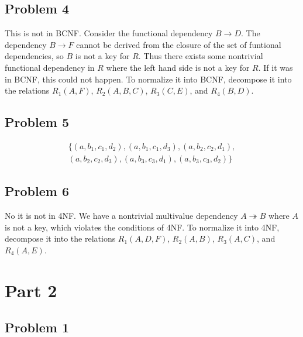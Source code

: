 \documentclass[12pt]{article}
\begin{document}
\subsection*{Problem 4}

This is not in BCNF. Consider the functional dependency \(B\rightarrow D\). The dependency \(B\rightarrow F\) cannot be derived from the closure of the
set of funtional dependencies, so \(B\) is not a key for \(R\). Thus there exists some nontrivial functional dependency in \(R\) where the left hand side
is not a key for \(R\). If it was in BCNF, this could not happen. To normalize it into BCNF, decompose it into the relations \(R_1(A,F)\), \(R_2(A,B,C)\),
\(R_3(C,E)\), and \(R_4(B,D)\).

\subsection*{Problem 5}

\begin{multline*}
        \{(a,b_1,c_1,d_2),(a,b_1,c_1,d_3),(a,b_2,c_2,d_1),\\
        (a,b_2,c_2,d_3),(a,b_3,c_3,d_1),(a,b_3,c_3,d_2)\}
\end{multline*}

\subsection*{Problem 6}

No it is not in 4NF. We have a nontrivial multivalue dependency \(A\twoheadrightarrow B\) where \(A\) is not a key, which violates the
conditions of 4NF. To normalize it into 4NF, decompose it into the relations \(R_1(A,D,F)\), \(R_2(A,B)\), \(R_3(A,C)\), and \(R_4(A,E)\).

\pagebreak

\section*{Part 2}

\subsection*{Problem 1}
\end{document}
